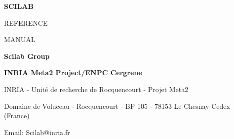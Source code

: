 \pagestyle{empty}
\begin{center}
\end{center} 

\newpage

\vspace{8.cm}

\Huge\bf
SCILAB

REFERENCE

MANUAL

\vspace{3.cm}

{\Huge\bf Scilab Group}

\Large\bf
INRIA Meta2 Project/ENPC Cergrene

\normalsize

\vspace{12.cm}

INRIA - Unit\'e de recherche de Rocquencourt - Projet Meta2

Domaine de Voluceau - Rocquencourt - BP 105 - 78153 Le Chesnay Cedex (France)

Email: Scilab@inria.fr
